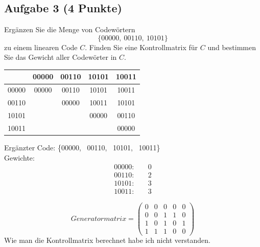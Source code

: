 \documentclass{article} %
\begin{document}
\subsection*{Aufgabe 3 (4 Punkte)}
Ergänzen Sie die Menge von Codewörtern
\[
\{00000, \ 00110, \ 10101\}
\]
zu einem linearen Code $C$. Finden Sie eine Kontrollmatrix für $C$ und bestimmen Sie das Gewicht aller Codewörter in $C$.
\begin{mybox}
\begin{table}[H]
    \centering
    \begin{tabular}{c|cccc}
        & 00000 & 00110 & 10101 & 10011\\ \hline
   00000& 00000 & 00110 & 10101 & 10011\\
   00110&       & 00000 & 10011 & 10101\\
   10101&       &       & 00000 & 00110\\
   10011&       &       &       & 00000\\
    \end{tabular}
\end{table}
Ergänzter Code: \{00000, \ 00110, \ 10101, \ 10011\}\\
Gewichte: 
\begin{align*}
    00000: & \quad 0\\
    00110: & \quad 2\\
    10101: & \quad 3\\
    10011: & \quad 3
\end{align*}
\end{mybox}
\begin{mybox}
\[
Generatormatrix = \begin{pmatrix}
0 & 0 & 0 & 0 & 0 \\
0 & 0 & 1 & 1 & 0 \\
1 & 0 & 1 & 0 & 1 \\
1 & 1 & 1 & 0 & 0
\end{pmatrix}
\]
Wie man die Kontrollmatrix berechnet habe ich nicht verstanden. 
\end{mybox}
\end{document}
